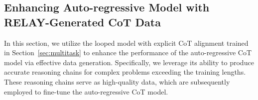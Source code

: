 

\subsection{Enhancing Auto-regressive Model with RELAY-Generated CoT Data}\label{ssec:relay_enhance_cot}

In this section, we utilize the looped model with explicit CoT alignment trained in Section~\ref{sec:multitask} to enhance the performance of the auto-regressive CoT model via effective data generation. Specifically, we leverage its ability to produce accurate reasoning chains for complex problems exceeding the training lengths. These reasoning chains serve as high-quality data, which are subsequently employed to fine-tune the auto-regressive CoT model.

